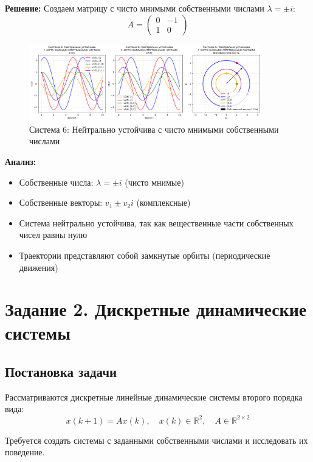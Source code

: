 \textbf{Решение:} Создаем матрицу с чисто мнимыми собственными числами $\lambda = \pm i$:
\begin{equation}
A = \begin{pmatrix} 0 & -1 \\ 1 & 0 \end{pmatrix}
\end{equation}

\begin{figure}[H]
    \centering
    \includegraphics[width=0.9\textwidth]{images/task1/system6_neutrally_stable.png}
    \caption{Система 6: Нейтрально устойчива с чисто мнимыми собственными числами}
\end{figure}

\textbf{Анализ:}
\begin{itemize}
    \item Собственные числа: $\lambda = \pm i$ (чисто мнимые)
    \item Собственные векторы: $v_1 \pm v_2 i$ (комплексные)
    \item Система нейтрально устойчива, так как вещественные части собственных чисел равны нулю
    \item Траектории представляют собой замкнутые орбиты (периодические движения)
\end{itemize}

\section*{Задание 2. Дискретные динамические системы}

\subsection*{Постановка задачи}

Рассматриваются дискретные линейные динамические системы второго порядка вида:
\begin{equation}
x(k + 1) = Ax(k), \quad x(k) \in \mathbb{R}^2, \quad A \in \mathbb{R}^{2 \times 2}
\end{equation}

Требуется создать системы с заданными собственными числами и исследовать их поведение.

